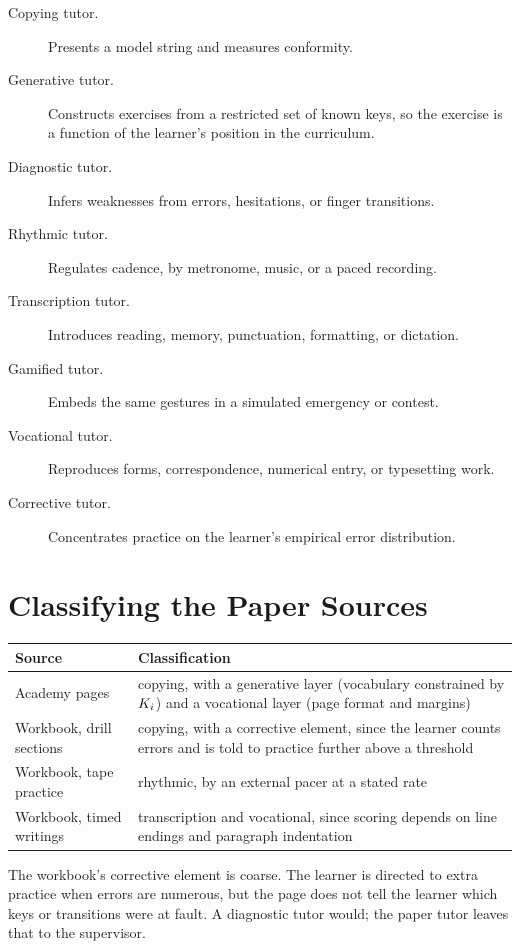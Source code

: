 \begin{description}
\item[Copying tutor.] Presents a model string and measures conformity.
\item[Generative tutor.] Constructs exercises from a restricted set of known keys, so the exercise is a function of the learner's position in the curriculum.
\item[Diagnostic tutor.] Infers weaknesses from errors, hesitations, or finger transitions.
\item[Rhythmic tutor.] Regulates cadence, by metronome, music, or a paced recording.
\item[Transcription tutor.] Introduces reading, memory, punctuation, formatting, or dictation.
\item[Gamified tutor.] Embeds the same gestures in a simulated emergency or contest.
\item[Vocational tutor.] Reproduces forms, correspondence, numerical entry, or typesetting work.
\item[Corrective tutor.] Concentrates practice on the learner's empirical error distribution.
\end{description}

\section{Classifying the Paper Sources}

\begin{center}
\begin{tabular}{@{}p{3.2cm}p{9cm}@{}}
\toprule
Source & Classification \\
\midrule
Academy pages & copying, with a generative layer (vocabulary constrained by $K_i$) and a vocational layer (page format and margins) \\
Workbook, drill sections & copying, with a corrective element, since the learner counts errors and is told to practice further above a threshold \\
Workbook, tape practice & rhythmic, by an external pacer at a stated rate \\
Workbook, timed writings & transcription and vocational, since scoring depends on line endings and paragraph indentation \\
\bottomrule
\end{tabular}
\end{center}

The workbook's corrective element is coarse. The learner is directed to extra practice when errors are numerous, but the page does not tell the learner which keys or transitions were at fault. A diagnostic tutor would; the paper tutor leaves that to the supervisor.

